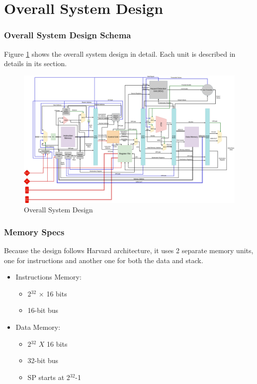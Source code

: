 \documentclass[12pt]{report}
\begin{document}
\part{Overall System Design}
\section{Overall System Design Schema}
Figure \ref{fig:overall} shows the overall system design in detail. Each unit is described in details in its section.
\begin{center}
    \begin{figure}[hp]
        \centering
        \includegraphics[width=\textwidth]{overall_system}
        \caption{Overall System Design}
        \label{fig:overall}
    \end{figure}
\end{center}

\section{Memory Specs}
Because the design follows Harvard architecture, it uses 2 separate memory units, one for instructions and another one for both the data and stack.
\begin{itemize}
    \item Instructions Memory:
    \begin{itemize}
        \item 2$^{32}$ $\times$ 16 bits
        \item 16-bit bus
    \end{itemize}
    \item Data Memory:
    \begin{itemize}
        \item 2$^{32}$ $X$ 16 bits
        \item 32-bit bus
        \item SP starts at 2$^{32}$-1
    \end{itemize}
\end{itemize}
\end{document}
